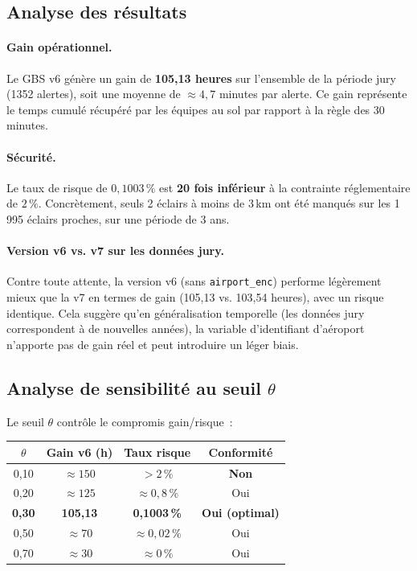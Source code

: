 \documentclass[a4paper,11pt]{article}
\begin{document}
\subsection{Analyse des résultats}

\paragraph{Gain opérationnel.} Le GBS v6 génère un gain de \textbf{105,13 heures} sur l'ensemble
de la période jury (1352 alertes), soit une moyenne de $\approx 4{,}7$ minutes par alerte. Ce
gain représente le temps cumulé récupéré par les équipes au sol par rapport à la règle des
30 minutes.

\paragraph{Sécurité.} Le taux de risque de $0{,}1003\,\%$ est \textbf{20 fois inférieur} à la
contrainte réglementaire de $2\,\%$. Concrètement, seuls 2 éclairs à moins de 3\,km ont été
manqués sur les 1\,995 éclairs proches, sur une période de 3 ans.

\paragraph{Version v6 vs. v7 sur les données jury.} Contre toute attente, la version v6
(sans \texttt{airport\_enc}) performe légèrement mieux que la v7 en termes de gain
(105,13 vs. 103,54 heures), avec un risque identique. Cela suggère qu'en généralisation temporelle
(les données jury correspondent à de nouvelles années), la variable d'identifiant d'aéroport
n'apporte pas de gain réel et peut introduire un léger biais.

\subsection{Analyse de sensibilité au seuil $\theta$}

Le seuil $\theta$ contrôle le compromis gain/risque~:

\begin{center}
\begin{tabular}{cccc}
\toprule
\textbf{$\theta$} & \textbf{Gain v6 (h)} & \textbf{Taux risque} & \textbf{Conformité} \\
\midrule
0,10 & $\approx 150$ & $> 2\,\%$ & \textbf{Non} \\
0,20 & $\approx 125$ & $\approx 0{,}8\,\%$ & Oui \\
\textbf{0,30} & \textbf{105,13} & \textbf{0,1003\,\%} & \textbf{Oui (optimal)} \\
0,50 & $\approx 70$ & $\approx 0{,}02\,\%$ & Oui \\
0,70 & $\approx 30$ & $\approx 0\,\%$ & Oui \\
\bottomrule
\end{tabular}
\end{center}
\end{document}
